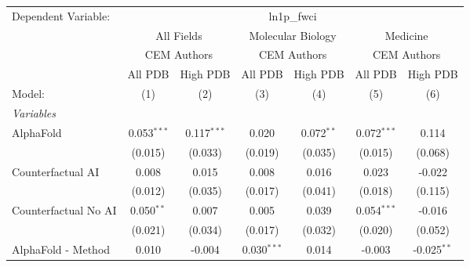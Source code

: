 \begingroup
\centering
\begin{tabular}{lcccccc}
   \tabularnewline \midrule \midrule
   Dependent Variable: & \multicolumn{6}{c}{ln1p\_fwci}\\
 & \multicolumn{2}{c}{All Fields} & \multicolumn{2}{c}{Molecular Biology} & \multicolumn{2}{c}{Medicine} \\
\cmidrule(lr){2-3} \cmidrule(lr){4-5} \cmidrule(lr){6-7}
 & \multicolumn{2}{c}{CEM Authors} & \multicolumn{2}{c}{CEM Authors} & \multicolumn{2}{c}{CEM Authors} \\
\cmidrule(lr){2-3} \cmidrule(lr){4-5} \cmidrule(lr){6-7}
 & \multicolumn{1}{c}{All PDB} & \multicolumn{1}{c}{High PDB} & \multicolumn{1}{c}{All PDB} & \multicolumn{1}{c}{High PDB} & \multicolumn{1}{c}{All PDB} & \multicolumn{1}{c}{High PDB} \\
\cmidrule(lr){2-2} \cmidrule(lr){3-3} \cmidrule(lr){4-4} \cmidrule(lr){5-5} \cmidrule(lr){6-6} \cmidrule(lr){7-7}
   Model:                                                     & (1)            & (2)           & (3)           & (4)          & (5)           & (6)\\  
   \midrule
   \emph{Variables}\\
   AlphaFold                                                  & 0.053$^{***}$  & 0.117$^{***}$ & 0.020         & 0.072$^{**}$ & 0.072$^{***}$ & 0.114\\   
                                                              & (0.015)        & (0.033)       & (0.019)       & (0.035)      & (0.015)       & (0.068)\\   
   Counterfactual AI                                          & 0.008          & 0.015         & 0.008         & 0.016        & 0.023         & -0.022\\   
                                                              & (0.012)        & (0.035)       & (0.017)       & (0.041)      & (0.018)       & (0.115)\\   
   Counterfactual No AI                                       & 0.050$^{**}$   & 0.007         & 0.005         & 0.039        & 0.054$^{***}$ & -0.016\\   
                                                              & (0.021)        & (0.034)       & (0.017)       & (0.032)      & (0.020)       & (0.052)\\   
   AlphaFold - Method                                         & 0.010          & -0.004        & 0.030$^{***}$ & 0.014        & -0.003        & -0.025$^{**}$\\   

\end{tabular}
